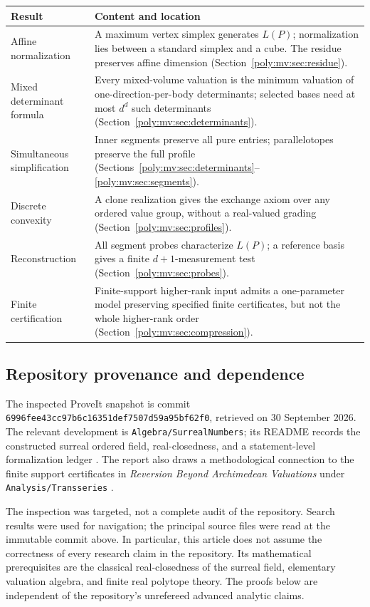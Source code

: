 \documentclass[11pt,a4paper]{article}
\numberwithin{equation}{section}
\theoremstyle{plain}
\newcommand{\pathcode}[1]{\nolinkurl{#1}}
\begin{document}
\begin{center}
\begin{tabular}{@{}p{}p{}@{}}
\toprule
Result & Content and location\\
\midrule
Affine normalization & A maximum vertex simplex generates $L(P)$;
normalization lies between a standard simplex and a cube. The residue
preserves affine dimension (Section~\ref{poly:mv:sec:residue}).\\[0.5em]
Mixed determinant formula & Every mixed-volume valuation is the minimum
valuation of one-direction-per-body determinants; selected bases need at
most $d^d$ such determinants (Section~\ref{poly:mv:sec:determinants}).\\[0.5em]
Simultaneous simplification & Inner segments preserve all pure entries;
parallelotopes preserve the full profile
(Sections~\ref{poly:mv:sec:determinants}--\ref{poly:mv:sec:segments}).\\[0.5em]
Discrete convexity & A clone realization gives the exchange axiom over
any ordered value group, without a real-valued grading
(Section~\ref{poly:mv:sec:profiles}).\\[0.5em]
Reconstruction & All segment probes characterize $L(P)$; a reference
basis gives a finite $d+1$-measurement test
(Section~\ref{poly:mv:sec:probes}).\\[0.5em]
Finite certification & Finite-support higher-rank input admits a
one-parameter model preserving specified finite certificates, but not the
whole higher-rank order (Section~\ref{poly:mv:sec:compression}).\\
\bottomrule
\end{tabular}
\end{center}

\subsection{Repository provenance and dependence}
The inspected ProveIt snapshot is commit
\pathcode{6996fee43cc97b6c16351def7507d59a95bf62f0}, retrieved on
30 September 2026. The relevant development is
\pathcode{Algebra/SurrealNumbers}; its README records the constructed
surreal ordered field, real-closedness, and a statement-level formalization
ledger \cite{mv:RepoSurreal}. The report also draws a methodological
connection to the finite support certificates in
\emph{Reversion Beyond Archimedean Valuations} under
\pathcode{Analysis/Transseries} \cite{mv:RepoReversion}.

The inspection was targeted, not a complete audit of the repository.
Search results were used for navigation; the principal source files were
read at the immutable commit above. In particular, this article does not
assume the correctness of every research claim in the repository. Its
mathematical prerequisites are the classical real-closedness of the surreal
field, elementary valuation algebra, and finite real polytope theory.
The proofs below are independent of the repository's unrefereed advanced
analytic claims.
\end{document}

